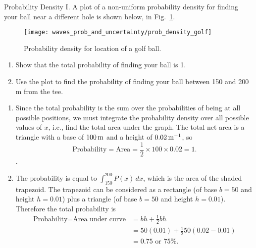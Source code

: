 \begin{example}{Probability Density I.}
A plot of a non-uniform probability density for finding your ball near
a different hole is shown below, in Fig.~\ref{fig:prob_density_golf}.

\begin{figure}[!h]
\begin{center}
\texttt{[image: waves\_prob\_and\_uncertainty/prob\_density\_golf]}
\end{center}
\caption{Probability density for location of a golf ball.}
\label{fig:prob_density_golf}
\end{figure}



\begin{enumerate}
\item Show that the total probability of finding your ball is 1.
\item Use the plot to find the probability of finding your ball
  between 150 and 200 m from the tee.
\end{enumerate}
\solution 
\begin{enumerate}
\item Since the total probability is the sum over the probabilities
 of being at all possible positions, we must integrate the probability 
density over all possible values of $x$, i.e., find the total area under 
the graph.  The total net area is a triangle with 
a base of $100\,\mbox{m}$ and a height of $0.02\,\mbox{m$^{-1}$}$, so 
\begin{equation}
\text{Probability} = \text{Area} = {\textstyle\frac{1}{2}}\times 100
\times 0.02 = 1  .
\end{equation}.
\item The probability is equal to $\int_{150}^{200}P(x)\, dx$, which is the 
area of the shaded trapezoid.  The trapezoid can be considered as a rectangle 
(of base $b = 50$ and height $h = 0.01$) plus a triangle (of base $b = 50$ 
and height $h = 0.01$). Therefore the total probability is
\begin{align}
\text{Probability} = \text{Area under curve} %
  &= bh +  {\textstyle\frac{1}{2}b h}\nonumber \\
      &= 50 (0.01) + {\textstyle\frac{1}{2}}50 (0.02 - 0.01) \nonumber \\
                                 &= \boxed{0.75 \text{ or 75\%}.}
\end{align}
\end{enumerate}
\end{example}

